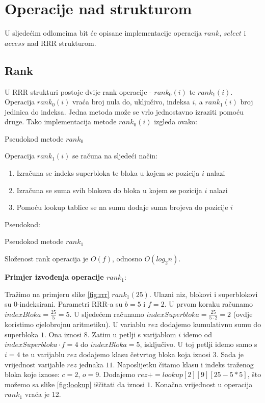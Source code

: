 \documentclass[times, utf8, seminar, numeric]{fer}
\begin{document}
\section{Operacije nad strukturom}
U sljedećim odlomcima bit će opisane implementacije operacija $rank$, $select$ i $access$ nad RRR strukturom.


\subsection{Rank}
U RRR strukturi postoje dvije rank operacije - $rank_0(i)$ te $rank_1(i)$. Operacija $rank_0(i)$ vraća broj nula do, uključivo, indeksa $i$, a $rank_1(i)$ broj jedinica do indeksa. 
Jedna metoda može se vrlo jednostavno izraziti pomoću druge. Tako implementacija metode $rank_0(i)$ izgleda ovako:


\begin{algorithm}[H]
 \caption{Pseudokod metode $rank_0$}
\end{algorithm}


Operacija $rank_1(i)$ se računa na sljedeći način:
\begin{enumerate}
	\item Izračuna se indeks superbloka te bloka u kojem se pozicija $i$ nalazi
	\item Izračuna se suma svih blokova do bloka u kojem se pozicija $i$ nalazi
	\item Pomoću lookup tablice se na sumu dodaje suma brojeva do pozicije $i$
\end{enumerate}
Pseudokod:

\begin{algorithm}[H]
 \caption{Pseudokod metode $rank_1$}
\end{algorithm}

Složenost rank operacija je $O(f)$, odnosno $O(log_2n)$.

\textbf{Primjer izvođenja operacije $rank_1$}:

Tražimo na primjeru slike \ref{fig:rrr} $rank_1(25)$. Ulazni niz, blokovi i superblokovi su 0-indeksirani. Parametri RRR-a su $b=5$ i $f=2$. U prvom koraku računamo $indexBloka=\frac{25}{5}=5$.  U sljedećem računamo $indexSuperbloka=\frac{25}{5 \cdot 2}=2$ (ovdje koristimo cjelobrojnu aritmetiku). U variablu $rez$ dodajemo kumulativnu sumu do superbloka $1$. Ona iznosi $8$. Zatim u petlji s varijablom $i$ idemo od $indexSuperbloka \cdot f=4$ do $indexBloka=5$, isključivo. U toj petlji idemo samo s $i=4$ te u varijablu $rez$ dodajemo klasu četvrtog bloka koja iznosi $3$. Sada je vrijednost varijable $rez$ jednaka $11$. Naposlijetku čitamo klasu i indeks traženog bloka koje iznose: $c=2$, $o=9$. Dodajemo $rez+=lookup[2][9][25-5*5]$, što možemo sa slike \ref{fig:lookup} iščitati da iznosi $1$. Konačna vrijednost u operacija $rank_1$ vraća je 12. 
\end{document}
